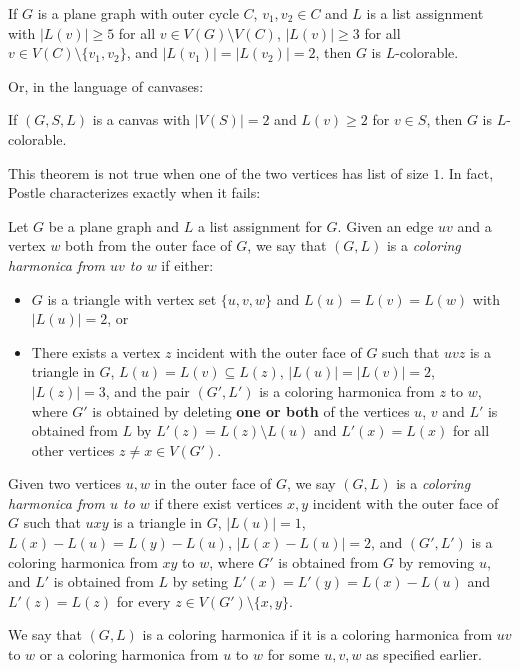 \begin{theorem}
\label{twolistsofsizetwo}
If $G$ is a plane graph with outer cycle $C$, $v_1, v_2 \in C$ and $L$ is a list assignment with $|L(v)| \geq 5$ for all $v \in V(G) \setminus V(C)$, $|L(v)| \geq 3$ for all $v \in V(C) \setminus \{v_1, v_2\}$, and $|L(v_1)| = |L(v_2)| = 2$, then $G$ is $L$-colorable. 
\end{theorem}

Or, in the language of canvases:

\begin{theorem}
If $(G, S, L)$ is a canvas with $|V(S)| = 2$ and $L(v) \geq 2$ for $v \in S$, then $G$ is $L$-colorable.
\end{theorem}

This theorem is not true when one of the two vertices has list of size $1$. In fact, Postle characterizes exactly when it fails:

\begin{definition}
Let $G$ be a plane graph and $L$ a list assignment for $G$. Given an edge $uv$ and a vertex $w$ both from the outer face of $G$, we say that $(G, L)$ is a \emph{coloring harmonica from $uv$ to $w$} if either:

	\begin{itemize}
		\item $G$ is a triangle with vertex set $\{u, v, w\}$ and $L(u) = L(v) = L(w)$ with $|L(u)| = 2$, or
		\item There exists a vertex $z$ incident with the outer face of $G$ such that $uvz$ is a triangle in $G$, $L(u) = L(v) \subseteq L(z)$, $|L(u)| = |L(v)| = 2$, $|L(z)| = 3$, and the pair $(G', L')$ is a coloring harmonica from $z$ to $w$, where $G'$ is obtained by deleting \textbf{one or both} of the vertices $u$, $v$ and $L'$ is obtained from $L$ by $L'(z) = L(z) \setminus L(u)$ and $L'(x) = L(x)$ for all other vertices $z \neq x \in V(G')$.
	\end{itemize}

	Given two vertices $u, w$ in the outer face of $G$, we say $(G, L)$ is a \emph{coloring harmonica from $u$ to $w$} if there exist vertices $x, y$ incident with the outer face of $G$ such that $uxy$ is a triangle in $G$, $|L(u)| = 1$, $L(x) - L(u) = L(y) - L(u)$, $|L(x)-L(u)|=2$, and $(G', L')$ is a coloring harmonica from $xy$ to $w$, where $G'$ is obtained from $G$ by removing $u$, and $L'$ is obtained from $L$ by seting $L'(x) = L'(y) = L(x)-L(u)$ and $L'(z) = L(z)$ for every $z \in V(G') \setminus \{x, y\}$.


We say that $(G, L)$ is a coloring harmonica if it is a coloring harmonica from $uv$ to $w$ or a coloring harmonica from $u$ to $w$ for some $u, v, w$ as specified earlier.
\end{definition}

